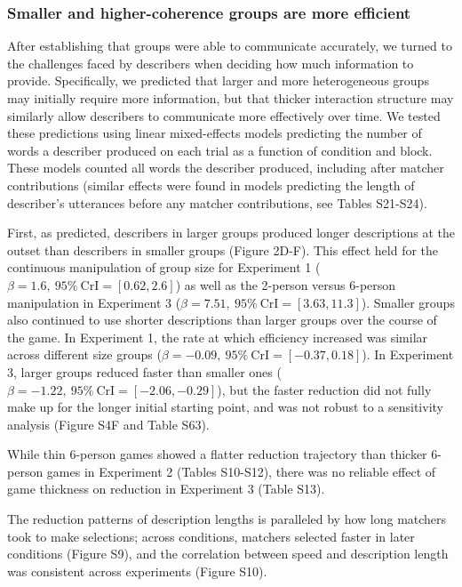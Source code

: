 \documentclass[9pt,twocolumn,twoside]{pnas-new}
\begin{document}
\subsubsection*{Smaller and higher-coherence groups are more
efficient}\label{smaller-and-higher-coherence-groups-are-more-efficient}

After establishing that groups were able to communicate accurately, we
turned to the challenges faced by describers when deciding how much
information to provide. Specifically, we predicted that larger and more
heterogeneous groups may initially require more information, but that
thicker interaction structure may similarly allow describers to
communicate more effectively over time. We tested these predictions
using linear mixed-effects models predicting the number of words a
describer produced on each trial as a function of condition and block.
These models counted all words the describer produced, including after
matcher contributions (similar effects were found in models predicting
the length of describer's utterances before any matcher contributions,
see Tables S21-S24).

First, as predicted, describers in larger groups produced longer
descriptions at the outset than describers in smaller groups (Figure
2D-F). This effect held for the continuous
manipulation of group size for Experiment 1
(\(\beta=1.6,\:95\%\:\mathrm{CrI}=[0.62, 2.6]\)) as well as the 2-person
versus 6-person manipulation in Experiment 3
(\(\beta=7.51,\:95\%\:\mathrm{CrI}=[3.63, 11.3]\)). Smaller groups also
continued to use shorter descriptions than larger groups over the course
of the game. In Experiment 1, the rate at which efficiency increased was
similar across different size groups
(\(\beta=-0.09,\:95\%\:\mathrm{CrI}=[-0.37, 0.18]\)). In Experiment 3,
larger groups reduced faster than smaller ones
(\(\beta=-1.22,\:95\%\:\mathrm{CrI}=[-2.06, -0.29]\)), but the faster
reduction did not fully make up for the longer initial starting point,
and was not robust to a sensitivity analysis (Figure S4F and Table
S63).

While thin 6-person games showed a flatter reduction trajectory than
thicker 6-person games in Experiment 2 (Tables S10-S12), there was no
reliable effect of game thickness on reduction in Experiment 3 (Table
S13).

The reduction patterns of description lengths is paralleled by how long
matchers took to make selections; across conditions, matchers selected
faster in later conditions (Figure S9), and the correlation between
speed and description length was consistent across experiments (Figure S10).
\end{document}
